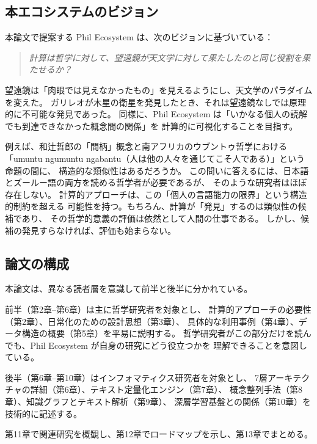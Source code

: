 \documentclass[a4paper,11pt]{ltjsarticle}
\begin{document}
\subsection{本エコシステムのビジョン}

本論文で提案する Phil Ecosystem は、次のビジョンに基づいている：

\begin{quote}
\textit{計算は哲学に対して、望遠鏡が天文学に対して果たしたのと同じ役割を果たせるか？}
\end{quote}

望遠鏡は「肉眼では見えなかったもの」を見えるようにし、天文学のパラダイムを変えた。
ガリレオが木星の衛星を発見したとき、それは望遠鏡なしでは原理的に不可能な発見であった。
同様に、Phil Ecosystem は「いかなる個人の読解でも到達できなかった概念間の関係」を
計算的に可視化することを目指す。

例えば、和辻哲郎の「間柄」概念と南アフリカのウブントゥ哲学における
「umuntu ngumuntu ngabantu（人は他の人々を通じてこそ人である）」という命題の間に、
構造的な類似性はあるだろうか。
この問いに答えるには、日本語とズールー語の両方を読める哲学者が必要であるが、
そのような研究者はほぼ存在しない。
計算的アプローチは、この「個人の言語能力の限界」という構造的制約を超える
可能性を持つ。もちろん、計算が「発見」するのは類似性の候補であり、
その哲学的意義の評価は依然として人間の仕事である。
しかし、候補の発見すらなければ、評価も始まらない。

\subsection{論文の構成}

本論文は、異なる読者層を意識して前半と後半に分かれている。

前半（第2章--第6章）は主に哲学研究者を対象とし、
計算的アプローチの必要性（第2章）、日常化のための設計思想（第3章）、
具体的な利用事例（第4章）、データ構造の概要（第5章）を平易に説明する。
哲学研究者がこの部分だけを読んでも、Phil Ecosystem が自身の研究にどう役立つかを
理解できることを意図している。

後半（第6章--第10章）はインフォマティクス研究者を対象とし、
7層アーキテクチャの詳細（第6章）、テキスト定量化エンジン（第7章）、
概念整列手法（第8章）、知識グラフとテキスト解析（第9章）、
深層学習基盤との関係（第10章）を技術的に記述する。

第11章で関連研究を概観し、第12章でロードマップを示し、第13章でまとめる。


\end{document}

